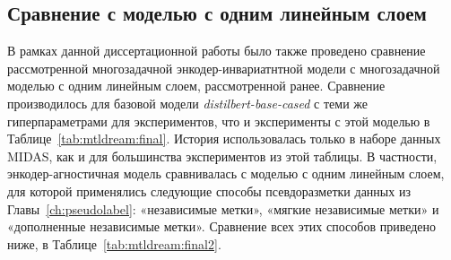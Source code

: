\subsection{Сравнение с моделью с одним линейным слоем}
В рамках данной диссертационной работы было также проведено сравнение рассмотренной многозадачной энкодер-инвариатнтной модели с многозадачной моделью с одним линейным слоем, рассмотренной ранее. Сравнение производилось для базовой модели \textit{distilbert-base-cased} с теми же гиперпараметрами для экспериментов, что и эксперименты с этой моделью в Таблице~\ref{tab:mtldream:final}. История использовалась только в наборе данных MIDAS, как и для большинства экспериментов из этой таблицы.
В частности, энкодер-агностичная модель сравнивалась с моделью с одним линейным слоем, для которой применялись следующие способы псевдоразметки данных из Главы~\ref{ch:pseudolabel}: «независимые метки», «мягкие независимые метки» и «дополненные независимые метки».
Сравнение всех этих способов приведено ниже, в Таблице~\ref{tab:mtldream:final2}.
